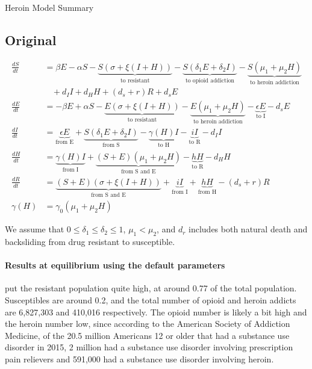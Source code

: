 \documentclass[11pt]{report}
\begin{document}
\begin{center}
{\Huge Heroin Model Summary}\\	
\end{center}
\vspace{1in}

\subsection*{Original}

\begin{align*}
	\frac{dS}{dt} &= \beta E - \alpha S - \underbrace{S(\sigma + \xi(I+H))}_{\text{to resistant}} - \underbrace{S(\delta_1 E + \delta_2 I)}_{\text{to opioid addiction}} - \underbrace{S(\mu_1+\mu_2H)}_{\text{to heroin addiction}}\\
	&\ \ \ \ + d_I I + d_H H + (d_s+r) R + d_s E\\
	\frac{dE}{dt} &= - \beta E + \alpha S - \underbrace{E(\sigma + \xi(I+H))}_{\text{to resistant}} - \underbrace{E(\mu_1 + \mu_2H)}_{\text{to heroin addiction}} - \underbrace{\epsilon E}_{\text{to I}} - d_s E\\
	\frac{dI}{dt} &= \underbrace{\epsilon E}_{\text{from E}} + \underbrace{S(\delta_1E+\delta_2I)}_{\text{from S}} - \underbrace{\gamma(H)I}_{\text{to H}} - \underbrace{iI}_{\text{to R}} - d_II\\
	\frac{dH}{dt} &= \underbrace{\gamma(H)I}_{\text{from I}} + \underbrace{(S+E)(\mu_1+\mu_2H)}_{\text{from S and E}} - \underbrace{hH}_{\text{to R}} - d_HH\\
	\frac{dR}{dt} &= \underbrace{(S+E)(\sigma + \xi(I+H))}_{\text{from S and E}} + \underbrace{iI}_{\text{from I}} + \underbrace{hH}_{\text{from H}} - (d_s+r)R\\
	\gamma(H) &= \gamma_0(\mu_1+\mu_2H)
\end{align*}

We assume that $0\leq\delta_1\leq\delta_2\leq 1$, $\mu_1<\mu_2$, and $d_r$ includes both natural death and backsliding from drug resistant to susceptible.

\paragraph{Results at equilibrium using the default parameters} put the resistant population quite high, at around 0.77 of the total population. Susceptibles are around 0.2, and the total number of opioid and heroin addicts are 6,827,303 and 410,016 respectively. The opioid number is likely a bit high and the heroin number low, since according to the American Society of Addiction Medicine, of the 20.5 million Americans 12 or older that had a substance use disorder in 2015, 2 million had a substance use disorder involving prescription pain relievers and 591,000 had a substance use disorder involving heroin.
\end{document}
